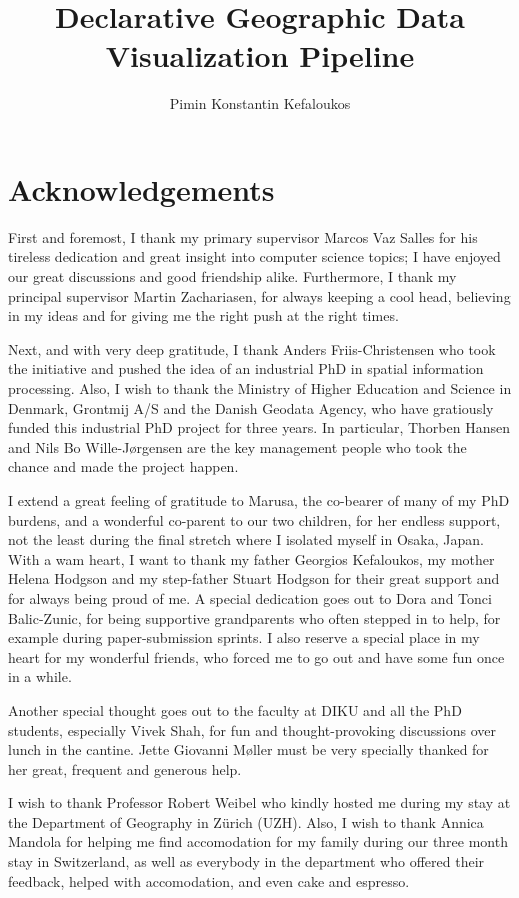 \documentclass[11pt, oneside]{report}
\title{Declarative Geographic Data Visualization Pipeline}
\author{Pimin Konstantin Kefaloukos}
\begin{document}
\maketitle

\section*{Acknowledgements}
First and foremost, I thank my primary supervisor Marcos Vaz Salles for his tireless dedication and great insight into computer science topics; I have enjoyed our great discussions and good friendship alike. Furthermore, I thank my principal supervisor Martin Zachariasen, for always keeping a cool head, believing in my ideas and for giving me the right push at the right times. 

Next, and with very deep gratitude, I thank Anders Friis-Christensen who took the initiative and pushed the idea of an industrial PhD in spatial information processing. Also, I wish to thank the Ministry of Higher Education and Science in Denmark, Grontmij A/S and the Danish Geodata Agency, who have gratiously funded this industrial PhD project for three years. In particular, Thorben Hansen and Nils Bo Wille-J{\o}rgensen are the key management people who took the chance and made the project happen.

I extend a great feeling of gratitude to Marusa, the co-bearer of many of my PhD burdens, and a wonderful co-parent to our two children, for her endless support, not the least during the final stretch where I isolated myself in Osaka, Japan. With a wam heart, I want to thank my father Georgios Kefaloukos, my mother Helena Hodgson and my step-father Stuart Hodgson for their great support and for always being proud of me. A special dedication goes out to Dora and Tonci Balic-Zunic, for being supportive grandparents who often stepped in to help, for example during paper-submission sprints. I also reserve a special place in my heart for my wonderful friends, who forced me to go out and have some fun once in a while.

Another special thought goes out to the faculty at DIKU and all the PhD students, especially Vivek Shah, for fun and thought-provoking discussions over lunch in the cantine. Jette Giovanni M{\o}ller must be very specially thanked for her great, frequent and generous help. 

I wish to thank Professor Robert Weibel who kindly hosted me during my stay at the Department of Geography in Z{\"u}rich (UZH). Also, I wish to thank Annica Mandola for helping me find accomodation for my family during our three month stay in Switzerland, as well as everybody in the department who offered their feedback, helped with accomodation, and even cake and espresso. 
\end{document}
